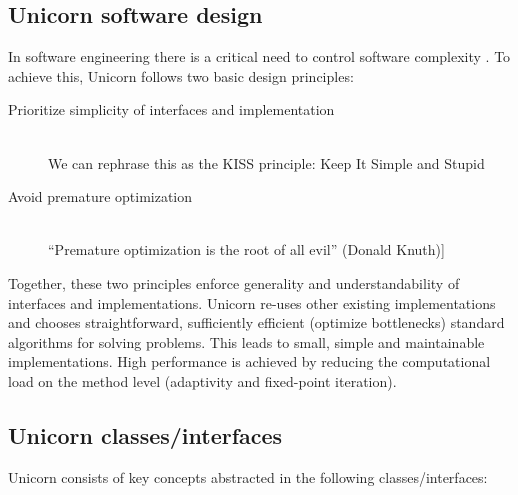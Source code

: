 \subsection{Unicorn software design}

In software engineering there is a critical need to control software
complexity \citep{Brooks1995}. To achieve this, Unicorn follows two
basic design principles:

\begin{description}
\item[Prioritize simplicity of interfaces and implementation]
\ \\
We can rephrase this as the KISS principle: Keep It Simple and Stupid
\item[Avoid premature optimization]
\ \\
``Premature optimization is the root of all evil'' (Donald Knuth)]
\end{description}

Together, these two principles enforce generality and
understandability of interfaces and implementations. Unicorn re-uses
other existing implementations and chooses straightforward,
sufficiently efficient (optimize bottlenecks) standard algorithms for
solving problems. This leads to small, simple and maintainable
implementations. High performance is achieved by reducing the
computational load on the method level (adaptivity and fixed-point
iteration).

\subsection{Unicorn classes/interfaces}

Unicorn consists of key concepts abstracted in the following
classes/interfaces:

